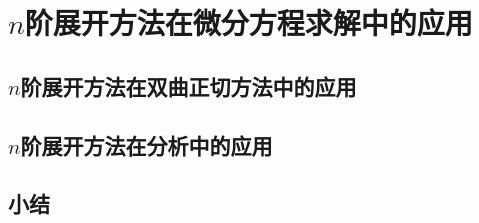 \chapter{$n$阶展开方法在微分方程求解中的应用}\label{ch05}
\section{$n$阶展开方法在双曲正切方法中的应用}
\section{$n$阶展开方法在\Painleve{}分析中的应用}
\section{小结}

